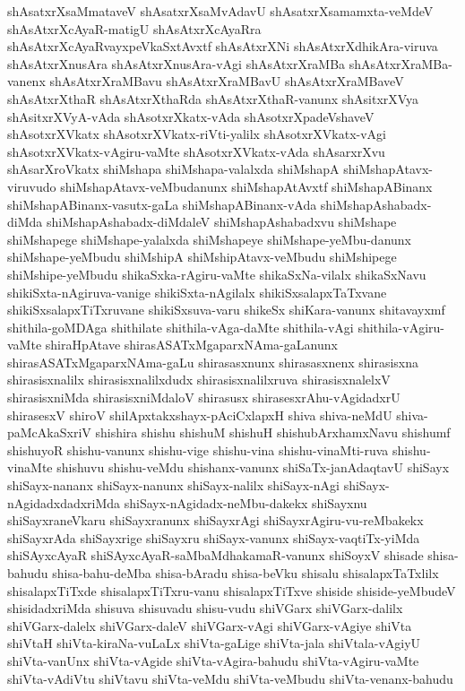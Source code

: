 {shAsatxrXsaMmataveV
shAsatxrXsaMvAdavU
shAsatxrXsamamxta-veMdeV
shAsAtxrXcAyaR-matigU
shAsAtxrXcAyaRra
shAsAtxrXcAyaRvayxpeVkaSxtAvxtf
shAsAtxrXNi
shAsAtxrXdhikAra-viruva
shAsAtxrXnusAra
shAsAtxrXnusAra-vAgi
shAsAtxrXraMBa
shAsAtxrXraMBa-vanenx
shAsAtxrXraMBavu
shAsAtxrXraMBavU
shAsAtxrXraMBaveV
shAsAtxrXthaR
shAsAtxrXthaRda
shAsAtxrXthaR-vanunx
shAsitxrXVya
shAsitxrXVyA-vAda
shAsotxrXkatx-vAda
shAsotxrXpadeVshaveV
shAsotxrXVkatx
shAsotxrXVkatx-riVti-yalilx
shAsotxrXVkatx-vAgi
shAsotxrXVkatx-vAgiru-vaMte
shAsotxrXVkatx-vAda
shAsarxrXvu
shAsarXroVkatx
shiMshapa
shiMshapa-valalxda
shiMshapA
shiMshapAtavx-viruvudo
shiMshapAtavx-veMbudanunx
shiMshapAtAvxtf
shiMshapABinanx
shiMshapABinanx-vasutx-gaLa
shiMshapABinanx-vAda
shiMshapAshabadx-diMda
shiMshapAshabadx-diMdaleV
shiMshapAshabadxvu
shiMshape
shiMshapege
shiMshape-yalalxda
shiMshapeye
shiMshape-yeMbu-danunx
shiMshape-yeMbudu
shiMshipA
shiMshipAtavx-veMbudu
shiMshipege
shiMshipe-yeMbudu
shikaSxka-rAgiru-vaMte
shikaSxNa-vilalx
shikaSxNavu
shikiSxta-nAgiruva-vanige
shikiSxta-nAgilalx
shikiSxsalapxTaTxvane
shikiSxsalapxTiTxruvane
shikiSxsuva-varu
shikeSx
shiKara-vanunx
shitavayxmf
shithila-goMDAga
shithilate
shithila-vAga-daMte
shithila-vAgi
shithila-vAgiru-vaMte
shiraHpAtave
shirasASATxMgaparxNAma-gaLanunx
shirasASATxMgaparxNAma-gaLu
shirasasxnunx
shirasasxnenx
shirasisxna
shirasisxnalilx
shirasisxnalilxdudx
shirasisxnalilxruva
shirasisxnalelxV
shirasisxniMda
shirasisxniMdaloV
shirasusx
shirasesxrAhu-vAgidadxrU
shirasesxV
shiroV
shilApxtakxshayx-pAciCxlapxH
shiva
shiva-neMdU
shiva-paMcAkaSxriV
shishira
shishu
shishuM
shishuH
shishubArxhamxNavu
shishumf
shishuyoR
shishu-vanunx
shishu-vige
shishu-vina
shishu-vinaMti-ruva
shishu-vinaMte
shishuvu
shishu-veMdu
shishanx-vanunx
shiSaTx-janAdaqtavU
shiSayx
shiSayx-nananx
shiSayx-nanunx
shiSayx-nalilx
shiSayx-nAgi
shiSayx-nAgidadxdadxriMda
shiSayx-nAgidadx-neMbu-dakekx
shiSayxnu
shiSayxraneVkaru
shiSayxranunx
shiSayxrAgi
shiSayxrAgiru-vu-reMbakekx
shiSayxrAda
shiSayxrige
shiSayxru
shiSayx-vanunx
shiSayx-vaqtiTx-yiMda
shiSAyxcAyaR
shiSAyxcAyaR-saMbaMdhakamaR-vanunx
shiSoyxV
shisade
shisa-bahudu
shisa-bahu-deMba
shisa-bAradu
shisa-beVku
shisalu
shisalapxTaTxlilx
shisalapxTiTxde
shisalapxTiTxru-vanu
shisalapxTiTxve
shiside
shiside-yeMbudeV
shisidadxriMda
shisuva
shisuvadu
shisu-vudu
shiVGarx
shiVGarx-dalilx
shiVGarx-dalelx
shiVGarx-daleV
shiVGarx-vAgi
shiVGarx-vAgiye
shiVta
shiVtaH
shiVta-kiraNa-vuLaLx
shiVta-gaLige
shiVta-jala
shiVtala-vAgiyU
shiVta-vanUnx
shiVta-vAgide
shiVta-vAgira-bahudu
shiVta-vAgiru-vaMte
shiVta-vAdiVtu
shiVtavu
shiVta-veMdu
shiVta-veMbudu
shiVta-venanx-bahudu
}
